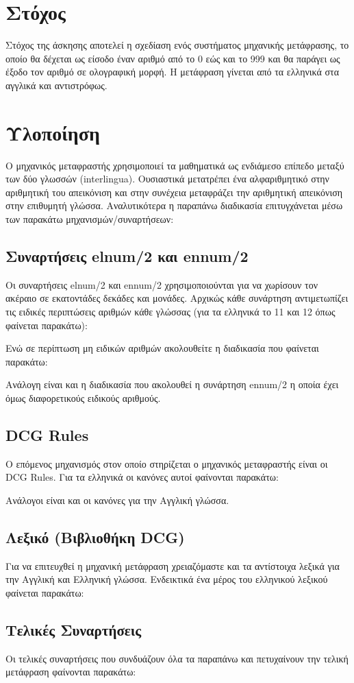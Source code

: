 \documentclass[a4paper,12pt]{article}
\begin{document}
\section{Στόχος}
Στόχος της άσκησης αποτελεί η σχεδίαση ενός συστήματος μηχανικής μετάφρασης, το οποίο θα δέχεται ως είσοδο έναν αριθμό από το 0 εώς και το 999 και θα παράγει ως έξοδο τον αριθμό σε ολογραφική μορφή. Η μετάφραση γίνεται από τα ελληνικά στα αγγλικά και αντιστρόφως. 
\section{Υλοποίηση}
Ο μηχανικός μεταφραστής χρησιμοποιεί τα μαθηματικά ως ενδιάμεσο επίπεδο μεταξύ των δύο γλωσσών (interlingua). Ουσιαστικά μετατρέπει ένα αλφαριθμητικό στην αριθμητική του απεικόνιση και στην συνέχεια μεταφράζει την αριθμητική απεικόνιση στην επιθυμητή γλώσσα. Αναλυτικότερα η παραπάνω διαδικασία επιτυγχάνεται μέσω των παρακάτω μηχανισμών/συναρτήσεων:
	\subsection{Συναρτήσεις elnum/2 και ennum/2}
	Οι συναρτήσεις elnum/2 και ennum/2 χρησιμοποιούνται για να χωρίσουν τον ακέραιο σε εκατοντάδες δεκάδες και μονάδες. Αρχικώς κάθε συνάρτηση αντιμετωπίζει τις ειδικές περιπτώσεις αριθμών κάθε γλώσσας (για τα ελληνικά το 11 και 12 όπως φαίνεται παρακάτω):

Ενώ σε περίπτωση μη ειδικών αριθμών ακολουθείτε η διαδικασία που φαίνεται παρακάτω:

Ανάλογη είναι και η διαδικασία που ακολουθεί η συνάρτηση ennum/2 η οποία έχει όμως διαφορετικούς ειδικούς αριθμούς.
	\subsection{DCG Rules}
	Ο επόμενος μηχανισμός στον οποίο στηρίζεται ο μηχανικός μεταφραστής είναι οι DCG Rules. Για τα ελληνικά οι κανόνες αυτοί φαίνονται παρακάτω:

Ανάλογοι είναι και οι κανόνες για την Αγγλική γλώσσα.
	\subsection{Λεξικό (Βιβλιοθήκη DCG)}
	Για να επιτευχθεί η μηχανική μετάφραση χρειαζόμαστε και τα αντίστοιχα λεξικά για την Αγγλική και Ελληνική γλώσσα. Ενδεικτικά ένα μέρος του ελληνικού λεξικού φαίνεται παρακάτω:
	
	\subsection{Τελικές Συναρτήσεις}	 
	Οι τελικές συναρτήσεις που συνδυάζουν όλα τα παραπάνω και πετυχαίνουν την τελική μετάφραση φαίνονται παρακάτω:
	
	
\end{document}

